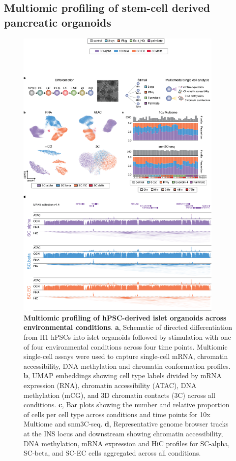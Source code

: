 \subsection{Multiomic profiling of stem-cell derived pancreatic organoids}

\begin{figure}[p]
    \centering
    \includegraphics[width=0.9\textwidth, height=0.745\textheight]{3_figures-and-files/Fig1.png}
    \caption[Multiomic profiling of hPSC-derived islet organoids]{\textbf{Multiomic profiling of hPSC-derived islet organoids across environmental conditions}. \textbf{a}, Schematic of directed differentiation from H1 hPSCs into islet organoids followed by stimulation with one of four environmental conditions across four time points. Multiomic single-cell assays were used to capture single-cell mRNA, chromatin accessibility, DNA methylation and chromatin conformation profiles. \textbf{b}, UMAP embeddings showing cell type labels divided by mRNA expression (RNA), chromatin accessibility (ATAC), DNA methylation (mCG), and 3D chromatin contacts (3C) across all conditions. \textbf{c}, Bar plots showing the number and relative proportion of cells per cell type across conditions and time points for 10x Multiome and snm3C-seq. \textbf{d}, Representative genome browser tracks at the INS locus and downstream showing chromatin accessibility, DNA methylation, mRNA expression and HiC profiles for SC-alpha, SC-beta, and SC-EC cells aggregated across all conditions.}
    \label{fig:3 Figure 1}
\end{figure}

